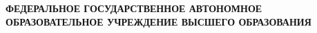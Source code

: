 \documentclass[14pt, russian]{scrartcl}
\begin{document}
\sloppy

\begin{titlepage}
\begin{center}

{\large \textbf{ФЕДЕРАЛЬНОЕ ГОСУДАРСТВЕННОЕ АВТОНОМНОЕ}}\\[0.3cm]
{\large \textbf{ОБРАЗОВАТЕЛЬНОЕ УЧРЕЖДЕНИЕ ВЫСШЕГО ОБРАЗОВАНИЯ}}\\[0.5cm]










\end{center}
\end{titlepage}
\end{document}
